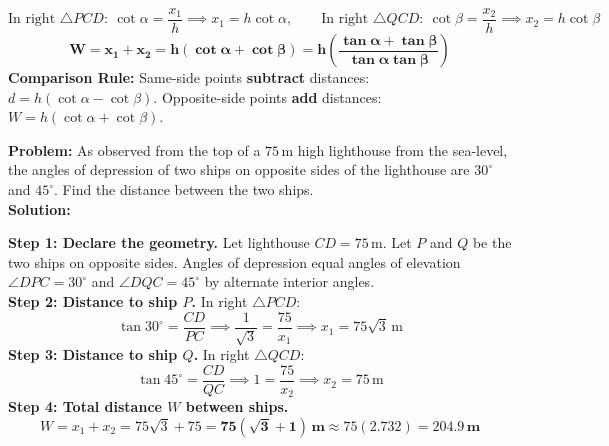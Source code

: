 \documentclass[10pt,a4paper]{article}
\begin{document}
\vspace{0.8mm}
\begin{formulaBox}[title=Master Governing Formula for Opposite-Side Configurations,fonttitle=\bfseries\color{navy}]
  $$\text{In right }\triangle PCD:\ \cot\alpha = \frac{x_1}{h} \implies x_1 = h\cot\alpha, \qquad \text{In right }\triangle QCD:\ \cot\beta = \frac{x_2}{h} \implies x_2 = h\cot\beta$$
  $$\mathbf{W = x_1 + x_2 = h(\cot\alpha + \cot\beta) = h\left(\frac{\tan\alpha + \tan\beta}{\tan\alpha\tan\beta}\right)}$$
  \textbf{Comparison Rule:} Same-side points \textbf{subtract} distances: $d = h(\cot\alpha - \cot\beta)$. Opposite-side points \textbf{add} distances: $W = h(\cot\alpha + \cot\beta)$.
\end{formulaBox}

\vspace{0.5mm}
\begin{conceptBox}[title=Worked Board Archetype: Two Ships on Opposite Sides of a Lighthouse,fonttitle=\bfseries\color{navy}]
  \textbf{Problem:} As observed from the top of a $75\,\text{m}$ high lighthouse from the sea-level, the angles of depression of two ships on opposite sides of the lighthouse are $30^\circ$ and $45^\circ$. Find the distance between the two ships. \\
  \textbf{Solution:}\par
  \textbf{Step 1: Declare the geometry.} Let lighthouse $CD = 75\,\text{m}$. Let $P$ and $Q$ be the two ships on opposite sides. Angles of depression equal angles of elevation $\angle DPC = 30^\circ$ and $\angle DQC = 45^\circ$ by alternate interior angles. \\
  \textbf{Step 2: Distance to ship $P$.} In right $\triangle PCD$:
  $$\tan 30^\circ = \frac{CD}{PC} \implies \frac{1}{\sqrt{3}} = \frac{75}{x_1} \implies x_1 = 75\sqrt{3}\,\text{m}$$
  \textbf{Step 3: Distance to ship $Q$.} In right $\triangle QCD$:
  $$\tan 45^\circ = \frac{CD}{QC} \implies 1 = \frac{75}{x_2} \implies x_2 = 75\,\text{m}$$
  \textbf{Step 4: Total distance $W$ between ships.}
  $$W = x_1 + x_2 = 75\sqrt{3} + 75 = \mathbf{75(\sqrt{3} + 1)\,\text{m}} \approx 75(2.732) = \mathbf{204.9\,\text{m}}$$
\end{conceptBox}

\newpage

\thispagestyle{fancy}
\vspace*{0mm}
\end{document}
